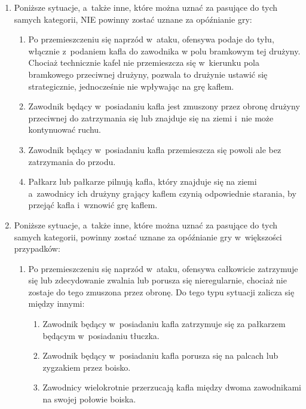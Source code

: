 \documentclass[12pt,a4paper]{article}
\begin{document}
\begin{enumerate}
	\item Poniższe sytuacje, a~także inne, które można uznać za pasujące do
	      tych samych kategorii, NIE powinny zostać uznane za opóźnianie gry:

	      \begin{enumerate}
		      \item  Po przemieszczeniu się naprzód w~ataku, ofensywa podaje do tyłu,
		            włącznie z~podaniem kafla do zawodnika w polu bramkowym tej drużyny. Chociaż
		            technicznie kafel nie przemieszcza się w~kierunku pola bramkowego
		            przeciwnej drużyny, pozwala to drużynie ustawić się strategicznie,
		            jednocześnie nie wpływając na grę kaflem.

		      \item Zawodnik będący w~posiadaniu kafla jest zmuszony przez obronę
		            drużyny przeciwnej do zatrzymania się lub znajduje się na ziemi i~nie może
		            kontynuować ruchu.

		      \item Zawodnik będący w~posiadaniu kafla przemieszcza się powoli ale bez zatrzymania do przodu.

		      \item Pałkarz lub pałkarze pilnują kafla, który znajduje się na ziemi a~zawodnicy ich drużyny grający kaflem czynią odpowiednie starania, by
		            przejąć kafla i~wznowić grę kaflem.
	      \end{enumerate}
	\item Poniższe sytuacje, a~także inne, które można uznać za pasujące do
	      tych samych kategorii, powinny zostać uznane za opóźnianie gry w~większości przypadków:
	      \begin{enumerate}
		      \item Po przemieszczeniu się naprzód w~ataku, ofensywa całkowicie
		            zatrzymuje się lub zdecydowanie zwalnia lub porusza się nieregularnie,
		            chociaż nie zostaje do tego zmuszona przez obronę. Do tego typu sytuacji
		            zalicza się między innymi:

		            \begin{enumerate}
			            \item
			                  Zawodnik będący w~posiadaniu kafla zatrzymuje się za pałkarzem będącym
			                  w~posiadaniu tłuczka.
			            \item
			                  Zawodnik będący w~posiadaniu kafla porusza się na palcach lub
			                  zygzakiem przez boisko.
			            \item
			                  Zawodnicy wielokrotnie przerzucają kafla między dwoma zawodnikami na swojej połowie boiska.
		            \end{enumerate}


\end{enumerate}
\end{enumerate}
\end{document}
